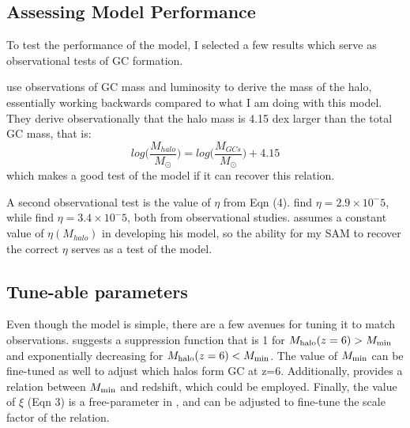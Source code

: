 \documentclass[onecolumn]{aastex62}
\begin{document}
\subsection{Assessing Model Performance}
To test the performance of the model, I selected a few results which serve as observational tests of GC formation.

\citealt{Spitler&Forbes2009} use observations of GC mass and luminosity to derive the mass of the halo, essentially working backwards compared to what I am doing with this model.  They derive observationally that the halo mass is 4.15 dex larger than the total GC mass, that is:  
\begin{equation}
    log\big(\frac{M_{halo}}{M_\odot}\big) = log\big(\frac{M_{GCs}}{M_\odot}\big) + 4.15
\end{equation}
which makes a good test of the model if it can recover this relation.  

A second observational test is the value of $\eta$ from Eqn (4).  \cite{Harris2017} find $\eta = 2.9 \times 10^-5$, while \cite{Forbes2016} find $\eta = 3.4 \times 10^-5$, both from observational studies.  \cite{MBK2017} assumes a constant value of $\eta(M_{halo})$ in developing his model, so the ability for my SAM to recover the correct $\eta$ serves as a test of the model.

\subsection{Tune-able parameters}\label{sec:params}
Even though the model is simple, there are a few avenues for tuning it to match observations.   suggests a suppression function that is 1 for $M_{\rm{halo}}(z=6) > M_{\rm{min}}$ and exponentially decreasing for $M_{\rm{halo}}(z=6) < M_{\rm{min}}$.  The value of $M_{\rm{min}}$ can be fine-tuned as well to adjust which halos form GC at z=6.  Additionally,  provides a relation between $M_{\rm{min}}$ and redshift, which could be employed.  Finally, the value of $\xi$ (Eqn 3) is a free-parameter in , and can be adjusted to fine-tune the scale factor of the \citealt{Spitler&Forbes2009} relation.
\end{document}
